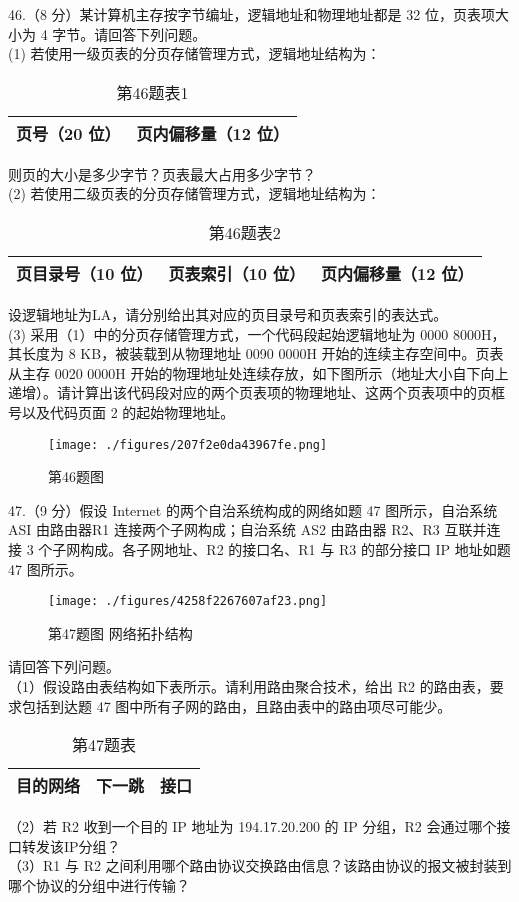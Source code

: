 46.（8 分）某计算机主存按字节编址，逻辑地址和物理地址都是 32 位，页表项大小为 4 字节。请回答下列问题。\\
(1) 若使用一级页表的分页存储管理方式，逻辑地址结构为： \\
\begin{table}[ht]
\centering
\caption{第46题表1}\label{tab_CSN13_4}
\begin{tabular}{|c|c|}
\hline
页号（20 位） & 页内偏移量（12 位） \\
\hline
\end{tabular}
\end{table}
则页的大小是多少字节？页表最大占用多少字节？  \\
(2) 若使用二级页表的分页存储管理方式，逻辑地址结构为： \\
\begin{table}[ht]
\centering
\caption{第46题表2}\label{tab_CSN13_5}
\begin{tabular}{|c|c|c|}
\hline
页目录号（10 位） & 页表索引（10 位） & 页内偏移量（12 位） \\
\hline
\end{tabular}
\end{table}
设逻辑地址为LA，请分别给出其对应的页目录号和页表索引的表达式。 \\
(3) 采用（1）中的分页存储管理方式，一个代码段起始逻辑地址为 0000 8000H，其长度为 8 KB，被装载到从物理地址 0090 0000H 开始的连续主存空间中。页表从主存 0020 0000H 开始的物理地址处连续存放，如下图所示（地址大小自下向上递增）。请计算出该代码段对应的两个页表项的物理地址、这两个页表项中的页框号以及代码页面 2 的起始物理地址。 \\
\begin{figure}[ht]
\centering
\texttt{[image: ./figures/207f2e0da43967fe.png]}
\caption{第46题图} \label{fig_CSN13_8}
\end{figure}

47.（9 分）假设 Internet 的两个自治系统构成的网络如题 47 图所示，自治系统 ASI 由路由器R1 连接两个子网构成；自治系统 AS2 由路由器 R2、R3 互联并连接 3 个子网构成。各子网地址、R2 的接口名、R1 与 R3 的部分接口 IP 地址如题 47 图所示。
\begin{figure}[ht]
\centering
\texttt{[image: ./figures/4258f2267607af23.png]}
\caption{第47题图 网络拓扑结构} \label{fig_CSN13_9}
\end{figure}
请回答下列问题。 \\
（1）假设路由表结构如下表所示。请利用路由聚合技术，给出 R2 的路由表，要求包括到达题 47 图中所有子网的路由，且路由表中的路由项尽可能少。 
\begin{table}[ht]
\centering
\caption{第47题表}\label{tab_CSN13_6}
\begin{tabular}{|c|c|c|}
\hline
目的网络 & 下一跳 & 接口 \\
\hline
\end{tabular}
\end{table}
（2）若 R2 收到一个目的 IP 地址为 194.17.20.200 的 IP 分组，R2 会通过哪个接口转发该IP分组？  \\
（3）R1 与 R2 之间利用哪个路由协议交换路由信息？该路由协议的报文被封装到哪个协议的分组中进行传输？

